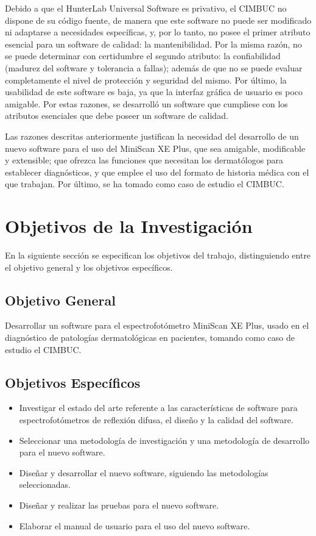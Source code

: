 Debido a que el HunterLab Universal Software es privativo, el CIMBUC no dispone de su c\'{o}digo fuente, de manera que este software no puede ser modificado ni adaptarse a necesidades espec\'{i}ficas, y, por lo tanto, no posee el primer atributo esencial para un software de calidad: la mantenibilidad. Por la misma raz\'{o}n, no se puede determinar con certidumbre el segundo atributo: la confiabilidad (madurez del software y tolerancia a fallas); adem\'{a}s de que no se puede evaluar completamente el nivel de protecci\'{o}n y seguridad del mismo. Por \'{u}ltimo, la usabilidad de este software es baja, ya que la interfaz gr\'{a}fica de usuario es poco amigable. Por estas razones, se desarroll\'{o} un software que cumpliese con los atributos esenciales que debe poseer un software de calidad.

Las razones descritas anteriormente justifican la necesidad del desarrollo de un nuevo software para el uso del MiniScan XE Plus, que sea amigable, modificable y extensible; que ofrezca las funciones que necesitan los dermat\'{o}logos para establecer diagn\'{o}sticos, y que emplee el uso del formato de historia m\'{e}dica con el que trabajan. Por \'{u}ltimo, se ha tomado como caso de estudio el CIMBUC.

	\newpage

	\section{Objetivos de la Investigaci\'{o}n}
En la siguiente secci\'{o}n se especifican los objetivos del trabajo, distinguiendo entre el objetivo general y los objetivos espec\'{i}ficos.
		\subsection{Objetivo General}
	Desarrollar un software para el espectrofot\'{o}metro MiniScan XE Plus, usado en el diagn\'{o}stico de patolog\'{i}as dermatol\'{o}gicas en pacientes, tomando como caso de estudio el CIMBUC.
		\subsection{Objetivos Espec\'{i}ficos}
			\begin{itemize}
				\item Investigar el estado del arte referente a las caracter\'{i}sticas de software para espectrofot\'{o}metros de reflexi\'{o}n difusa, el dise\~{n}o y la calidad del software.
				\item Seleccionar una metodolog\'{i}a de investigaci\'{o}n y una metodolog\'{i}a de desarrollo para el nuevo software.
				\item Dise\~{n}ar  y desarrollar el nuevo software, siguiendo las metodolog\'{i}as \mbox{seleccionadas}.
				\item Dise\~{n}ar y realizar las pruebas para el nuevo software.
				\item Elaborar el manual de usuario para el uso del nuevo software.
			\end{itemize}